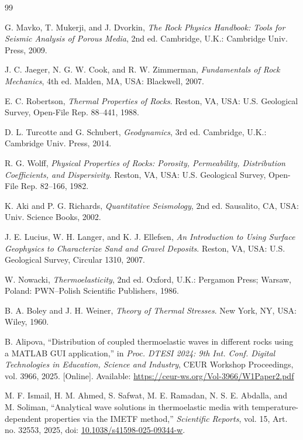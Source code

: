 \begin{thebibliography}{99}

G. Mavko, T. Mukerji, and J. Dvorkin,
\textit{The Rock Physics Handbook: Tools for Seismic Analysis of Porous Media}, 2nd ed.
Cambridge, U.K.: Cambridge Univ. Press, 2009.

J. C. Jaeger, N. G. W. Cook, and R. W. Zimmerman,
\textit{Fundamentals of Rock Mechanics}, 4th ed.
Malden, MA, USA: Blackwell, 2007.

E. C. Robertson,
\textit{Thermal Properties of Rocks}.
Reston, VA, USA: U.S. Geological Survey, Open-File Rep. 88--441, 1988.

D. L. Turcotte and G. Schubert,
\textit{Geodynamics}, 3rd ed.
Cambridge, U.K.: Cambridge Univ. Press, 2014.

R. G. Wolff,
\textit{Physical Properties of Rocks: Porosity, Permeability, Distribution Coefficients, and Dispersivity}.
Reston, VA, USA: U.S. Geological Survey, Open-File Rep. 82--166, 1982.

K. Aki and P. G. Richards,
\textit{Quantitative Seismology}, 2nd ed.
Sausalito, CA, USA: Univ. Science Books, 2002.

J. E. Lucius, W. H. Langer, and K. J. Ellefsen,
\textit{An Introduction to Using Surface Geophysics to Characterize Sand and Gravel Deposits}.
Reston, VA, USA: U.S. Geological Survey, Circular 1310, 2007.

W. Nowacki,
\textit{Thermoelasticity}, 2nd ed.
Oxford, U.K.: Pergamon Press; Warsaw, Poland: PWN--Polish Scientific Publishers, 1986.

B. A. Boley and J. H. Weiner,
\textit{Theory of Thermal Stresses}.
New York, NY, USA: Wiley, 1960.

B. Alipova,
``Distribution of coupled thermoelastic waves in different rocks using a MATLAB GUI application,''
in \textit{Proc. DTESI 2024: 9th Int. Conf. Digital Technologies in Education, Science and Industry},
CEUR Workshop Proceedings, vol. 3966, 2025. [Online]. Available: \url{https://ceur-ws.org/Vol-3966/W1Paper2.pdf}

M. F. Ismail, H. M. Ahmed, S. Safwat, M. E. Ramadan, N. S. E. Abdalla, and M. Soliman,
``Analytical wave solutions in thermoelastic media with temperature-dependent properties via the IMETF method,''
\textit{Scientific Reports}, vol. 15, Art. no. 32553, 2025, doi: \href{https://doi.org/10.1038/s41598-025-09344-w}{10.1038/s41598-025-09344-w}.


\end{thebibliography}
